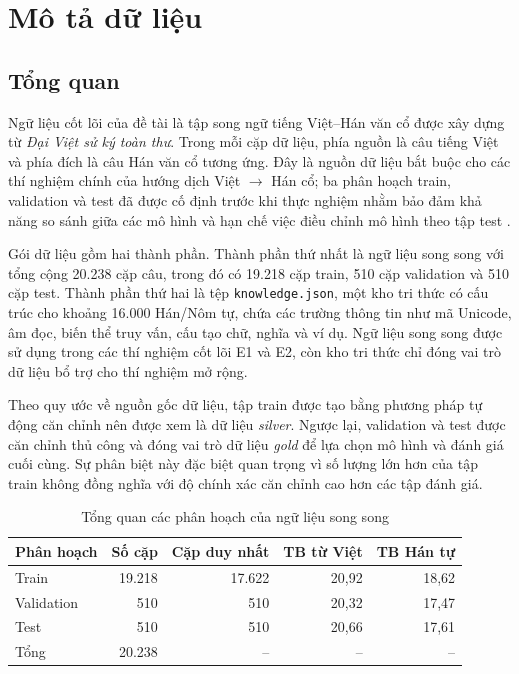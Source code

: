 \section{Mô tả dữ liệu}

\subsection{Tổng quan}

Ngữ liệu cốt lõi của đề tài là tập song ngữ tiếng Việt--Hán văn cổ được xây dựng từ \textit{Đại Việt sử ký toàn thư}. Trong mỗi cặp dữ liệu, phía nguồn là câu tiếng Việt và phía đích là câu Hán văn cổ tương ứng. Đây là nguồn dữ liệu bắt buộc cho các thí nghiệm chính của hướng dịch Việt $\rightarrow$ Hán cổ; ba phân hoạch train, validation và test đã được cố định trước khi thực nghiệm nhằm bảo đảm khả năng so sánh giữa các mô hình và hạn chế việc điều chỉnh mô hình theo tập test \cite{projectspec2026}.

Gói dữ liệu gồm hai thành phần. Thành phần thứ nhất là ngữ liệu song song với tổng cộng 20.238 cặp câu, trong đó có 19.218 cặp train, 510 cặp validation và 510 cặp test. Thành phần thứ hai là tệp \texttt{knowledge.json}, một kho tri thức có cấu trúc cho khoảng 16.000 Hán/Nôm tự, chứa các trường thông tin như mã Unicode, âm đọc, biến thể truy vấn, cấu tạo chữ, nghĩa và ví dụ. Ngữ liệu song song được sử dụng trong các thí nghiệm cốt lõi E1 và E2, còn kho tri thức chỉ đóng vai trò dữ liệu bổ trợ cho thí nghiệm mở rộng.

Theo quy ước về nguồn gốc dữ liệu, tập train được tạo bằng phương pháp tự động căn chỉnh nên được xem là dữ liệu \textit{silver}. Ngược lại, validation và test được căn chỉnh thủ công và đóng vai trò dữ liệu \textit{gold} để lựa chọn mô hình và đánh giá cuối cùng. Sự phân biệt này đặc biệt quan trọng vì số lượng lớn hơn của tập train không đồng nghĩa với độ chính xác căn chỉnh cao hơn các tập đánh giá.

\begin{table}[htbp]
    \centering
    \small
    \caption{Tổng quan các phân hoạch của ngữ liệu song song}
    \label{tab:dataset-overview}
    \begin{tabular}{lrrrr}
        \toprule
        \textbf{Phân hoạch} & \textbf{Số cặp} & \textbf{Cặp duy nhất} & \textbf{TB từ Việt} & \textbf{TB Hán tự} \\
        \midrule
        Train      & 19.218 & 17.622 & 20,92 & 18,62 \\
        Validation &    510 &    510 & 20,32 & 17,47 \\
        Test       &    510 &    510 & 20,66 & 17,61 \\
        \midrule
        Tổng       & 20.238 & --     & --    & --    \\
        \bottomrule
    \end{tabular}
\end{table}

